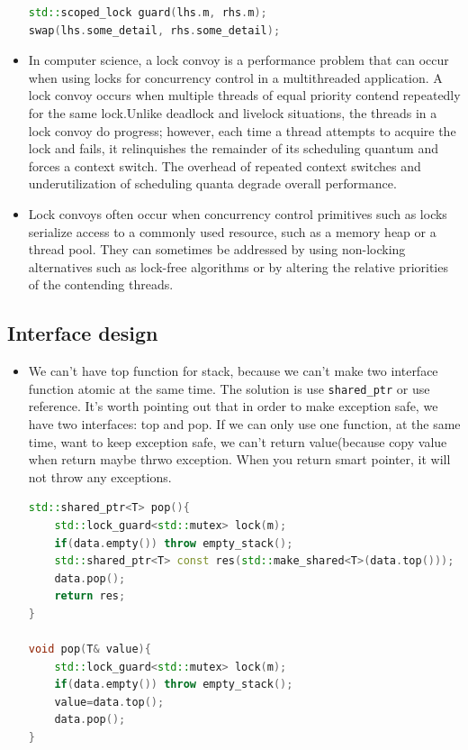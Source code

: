 \documentclass[a4paper,11pt,twoside]{book}
\begin{document}
\begin{itemize}
\begin{lstlisting}[frame=single, language=c++]
std::scoped_lock guard(lhs.m, rhs.m);
swap(lhs.some_detail, rhs.some_detail);	
\end{lstlisting}	

	\item In computer science, a lock convoy is a performance problem that can occur when using locks for concurrency control in a multithreaded application.  A lock convoy occurs when multiple threads of equal priority contend repeatedly for the same lock.Unlike deadlock and livelock situations, the threads in a lock convoy do progress; however, each time a thread attempts to acquire the lock and fails, it relinquishes the remainder of its scheduling quantum and forces a context switch. The overhead of repeated context switches and underutilization of scheduling quanta degrade overall performance.
	
	\item Lock convoys often occur when concurrency control primitives such as locks serialize access to a commonly used resource, such as a memory heap or a thread pool. They can sometimes be addressed by using non-locking alternatives such as lock-free algorithms or by altering the relative priorities of the contending threads.
	
	
\end{itemize}

\subsection{Interface design}
\begin{itemize}
	
	\item We can't have top function for stack, because we can't make two interface function atomic at the same time. The solution is use \texttt{shared\_ptr} or use reference. It's worth pointing out that in order to make exception safe, we have two interfaces: top and pop. If we can only use one function, at the same time, want to keep exception safe, we can't return value(because copy value when return maybe thrwo exception. When you return smart pointer, it will not throw any exceptions.
	
\begin{lstlisting}[frame=single, language=c++]
std::shared_ptr<T> pop(){
	std::lock_guard<std::mutex> lock(m);
	if(data.empty()) throw empty_stack();
	std::shared_ptr<T> const res(std::make_shared<T>(data.top()));
	data.pop();
	return res;
}

void pop(T& value){
	std::lock_guard<std::mutex> lock(m);
	if(data.empty()) throw empty_stack();
	value=data.top();
	data.pop();
}		
\end{lstlisting}	
	
\end{itemize}
\end{document}
